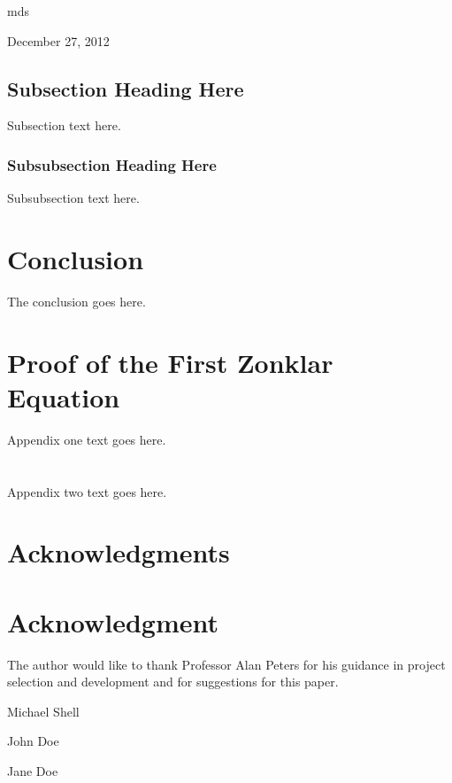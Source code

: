 \documentclass[12pt,journal,compsoc]{IEEEtran}
\begin{document}
\hfill mds
 
\hfill December 27, 2012

\subsection{Subsection Heading Here}
Subsection text here.


\subsubsection{Subsubsection Heading Here}
Subsubsection text here.



\section{Conclusion}
The conclusion goes here.


\appendices
\section{Proof of the First Zonklar Equation}
Appendix one text goes here.

\section{}
Appendix two text goes here.


\ifCLASSOPTIONcompsoc
  \section*{Acknowledgments}
\else
  \section*{Acknowledgment}
\fi


The author would like to thank Professor Alan Peters for his guidance in project selection and development and for suggestions for this paper.

\ifCLASSOPTIONcaptionsoff
  \newpage
\fi



\begin{IEEEbiography}{Michael Shell}
\end{IEEEbiography}


\begin{IEEEbiographynophoto}{John Doe}
\end{IEEEbiographynophoto}

\begin{IEEEbiographynophoto}{Jane Doe}

\end{IEEEbiographynophoto}
\end{document}
